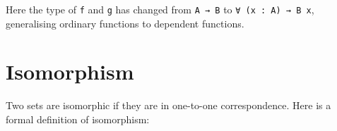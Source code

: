 Here the type of \texttt{f} and \texttt{g} has changed from
\texttt{A\ →\ B} to \texttt{∀\ (x\ :\ A)\ →\ B\ x}, generalising
ordinary functions to dependent functions.

\hypertarget{isomorphism}{%
\section{Isomorphism}\label{isomorphism}}

Two sets are isomorphic if they are in one-to-one correspondence. Here
is a formal definition of isomorphism:

\begin{fence}
\begin{code}%
\>[0]\AgdaSpace{}%
\AgdaSpace{}%
\<%
\\
\>[0]\AgdaSpace{}%
\AgdaSpace{}%
\AgdaSymbol{(}\AgdaSpace{}%
\AgdaSpace{}%
\AgdaSymbol{:}\AgdaSpace{}%
\AgdaSymbol{)}\AgdaSpace{}%
\AgdaSymbol{:}\AgdaSpace{}%
\AgdaSpace{}%
\<%
\\
\>[0][@{}l@{\AgdaIndent{0}}]%
\>[2]\<%
\\
\>[2][@{}l@{\AgdaIndent{0}}]%
\>[4]%
\>[9]\AgdaSymbol{:}\AgdaSpace{}%
\AgdaSpace{}%
\AgdaSpace{}%
\<%
\\
%
\>[4]\AgdaSpace{}%
\AgdaSymbol{:}\AgdaSpace{}%
\AgdaSpace{}%
\AgdaSpace{}%
\<%
\\
%
\>[4]\AgdaSpace{}%
\AgdaSymbol{:}\AgdaSpace{}%
\AgdaSpace{}%
\AgdaSymbol{(}\AgdaSpace{}%
\AgdaSymbol{:}\AgdaSpace{}%
\AgdaSymbol{)}\AgdaSpace{}%
\AgdaSpace{}%
\AgdaSpace{}%
\AgdaSymbol{(}\AgdaSpace{}%
\AgdaSymbol{)}\AgdaSpace{}%
\AgdaSpace{}%
\<%
\\
%
\>[4]\AgdaSpace{}%
\AgdaSymbol{:}\AgdaSpace{}%
\AgdaSpace{}%
\AgdaSymbol{(}\AgdaSpace{}%
\AgdaSymbol{:}\AgdaSpace{}%
\AgdaSymbol{)}\AgdaSpace{}%
\AgdaSpace{}%
\AgdaSpace{}%
\AgdaSymbol{(}\AgdaSpace{}%
\AgdaSymbol{)}\AgdaSpace{}%
\AgdaSpace{}%
\<%
\\
\>[0]\AgdaSpace{}%
\<%
\end{code}
\end{fence}

